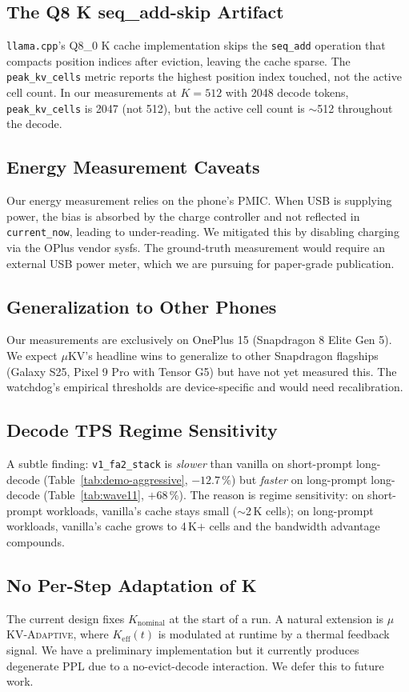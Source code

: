 \documentclass[sigconf, anonymous=false, screen=true]{acmart}
\begin{document}
\subsection{The Q8 K seq\_add-skip Artifact}
\texttt{llama.cpp}'s Q8\_0 K cache implementation skips the \texttt{seq\_add} operation that compacts position indices after eviction, leaving the cache sparse. The \texttt{peak\_kv\_cells} metric reports the highest position index touched, not the active cell count. In our measurements at $K{=}512$ with 2048 decode tokens, \texttt{peak\_kv\_cells} is 2047 (not 512), but the active cell count is $\sim$512 throughout the decode.

\subsection{Energy Measurement Caveats}
Our energy measurement relies on the phone's PMIC. When USB is supplying power, the bias is absorbed by the charge controller and not reflected in \texttt{current\_now}, leading to under-reading. We mitigated this by disabling charging via the OPlus vendor sysfs. The ground-truth measurement would require an external USB power meter, which we are pursuing for paper-grade publication.

\subsection{Generalization to Other Phones}
Our measurements are exclusively on OnePlus 15 (Snapdragon 8 Elite Gen 5). We expect \textsc{$\mu$KV}'s headline wins to generalize to other Snapdragon flagships (Galaxy S25, Pixel 9 Pro with Tensor G5) but have not yet measured this. The watchdog's empirical thresholds are device-specific and would need recalibration.

\subsection{Decode TPS Regime Sensitivity}
A subtle finding: \texttt{v1\_fa2\_stack} is \emph{slower} than vanilla on short-prompt long-decode (Table~\ref{tab:demo-aggressive}, $-12.7\,\%$) but \emph{faster} on long-prompt long-decode (Table~\ref{tab:wave11}, $+68\,\%$). The reason is regime sensitivity: on short-prompt workloads, vanilla's cache stays small ($\sim$2\,K cells); on long-prompt workloads, vanilla's cache grows to 4\,K$+$ cells and the bandwidth advantage compounds.

\subsection{No Per-Step Adaptation of K}
The current design fixes $K_{\text{nominal}}$ at the start of a run. A natural extension is \textsc{$\mu$KV-Adaptive}, where $K_{\text{eff}}(t)$ is modulated at runtime by a thermal feedback signal. We have a preliminary implementation but it currently produces degenerate PPL due to a no-evict-decode interaction. We defer this to future work.
\end{document}
